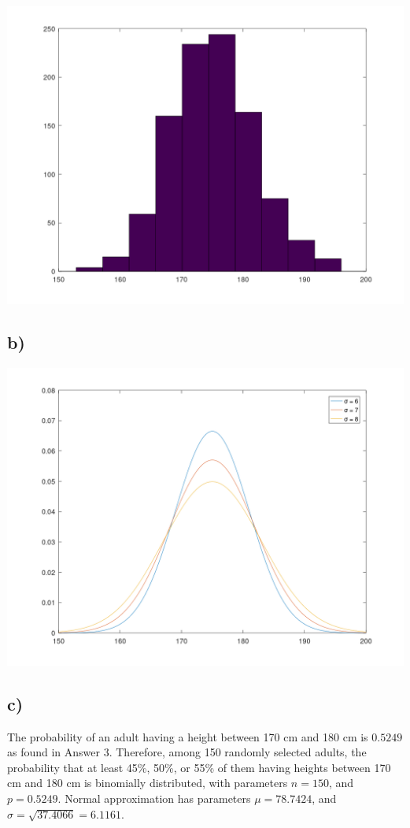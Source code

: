 \documentclass[12pt]{article}
\begin{document}
\includegraphics[width=\textwidth]{the2_hist.png}

\subsection*{b)}

\includegraphics[width=\textwidth]{the2_plot.png}

\newpage

\subsection*{c)}

The probability of an adult having a height between 170 cm and 180 cm is
$0.5249$ as found in Answer 3. Therefore, among 150 randomly selected adults,
the probability that at least 45\%, 50\%, or 55\% of them having heights between
170 cm and 180 cm is binomially distributed, with parameters $n = 150$, and $p =
0.5249$. Normal approximation has parameters $\mu = 78.7424$, and $\sigma = \sqrt{37.4066} = 6.1161$.
\end{document}
